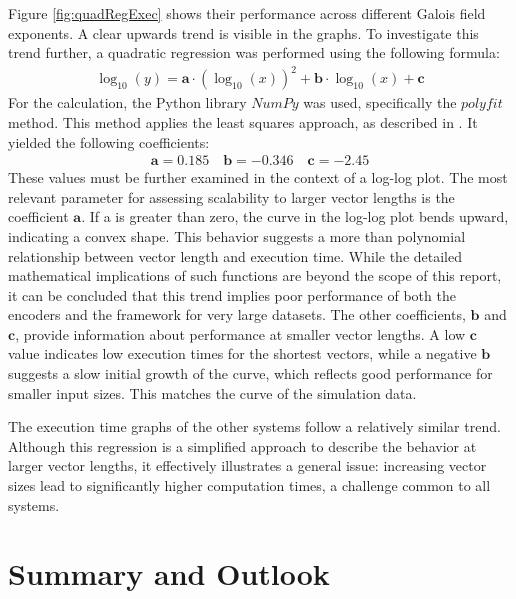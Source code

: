 \documentclass[english,BCOR=4mm,cdfont=false]{tudscrreprt} %
\begin{document}
Figure \ref{fig:quadRegExec} shows their performance across different Galois field exponents. A clear upwards trend is visible in the graphs. To investigate this trend further, a quadratic regression was performed using the following formula:
\begin{align*}
     \log_{10}(y) = \boldsymbol{a} \cdot \left( \log_{10}(x) \right)^2 + \boldsymbol{b} \cdot \log_{10}(x) + \boldsymbol{c}
 \end{align*}
 For the calculation, the Python library $NumPy$ was used, specifically the $polyfit$ method. This method applies the least squares approach, as described in \cite{leastSquareProblems}. It yielded the following coefficients:
 \begin{align*}
     \boldsymbol{a} = 0.185 \quad \boldsymbol{b} = -0.346 \quad \boldsymbol{c} = -2.45
 \end{align*}
These values must be further examined in the context of a log-log plot. The most relevant parameter for assessing scalability to larger vector lengths is the coefficient $\boldsymbol{a}$. If a is greater than zero, the curve in the log-log plot bends upward, indicating a convex shape. This behavior suggests a more than polynomial relationship between vector length and execution time. While the detailed mathematical implications of such functions are beyond the scope of this report, it can be concluded that this trend implies poor performance of both the encoders and the framework for very large datasets. The other coefficients, $\boldsymbol{b}$ and $\boldsymbol{c}$, provide information about performance at smaller vector lengths. A low $\boldsymbol{c}$ value indicates low execution times for the shortest vectors, while a negative $\boldsymbol{b}$ suggests a slow initial growth of the curve, which reflects good performance for smaller input sizes. This matches the curve of the simulation data.

The execution time graphs of the other systems follow a relatively similar trend. Although this regression is a simplified approach to describe the behavior at larger vector lengths, it effectively illustrates a general issue: increasing vector sizes lead to significantly higher computation times, a challenge common to all systems.


\chapter{Summary and Outlook}
\end{document}
